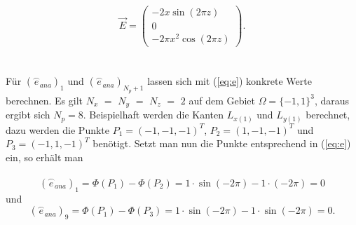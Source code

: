 \begin{equation} 
	\vec{E} = \begin{pmatrix} 
	-2x\sin(2\pi z) \\ 
	0\\ 
	-2\pi x^2\cos(2\pi z) 
	\end{pmatrix} 
	. 
\end{equation} \\ \\ 
Für $(\overset{\frown}{e}_{ana})_1$ und $(\overset{\frown}{e}_{ana})_{N_p+1}$ lassen sich mit (\ref{eq:e}) konkrete Werte berechnen. Es gilt $N_x$ $=$ $N_y$ $=$ $N_z$ $=$ $2$ auf dem Gebiet $\Omega = \{-1,1\}^3$, daraus ergibt sich $N_p = 8$. Beispielhaft werden die Kanten $L_{x(1)}$ und $L_{y(1)}$ berechnet, dazu werden die Punkte $P_1 = (-1,-1,-1)^T$, $P_2 = (1,-1,-1)^T$ und $P_3 = (-1,1,-1)^T$ benötigt. Setzt man nun die Punkte entsprechend in (\ref{eq:e}) ein, so erhält man \\ \\  
\begin{equation*} 
	(\overset{\frown}{e}_{ana})_1 = \Phi(P_1) - \Phi(P_2) = 1\cdot\sin(-2\pi) - 1\cdot(-2\pi) = 0 
\end{equation*} 
und  
\begin{equation*} 
(\overset{\frown}{e}_{ana})_9 = \Phi(P_1) - \Phi(P_3) = 1\cdot\sin(-2\pi) - 1\cdot\sin(-2\pi) = 0. 
\end{equation*} 
 
